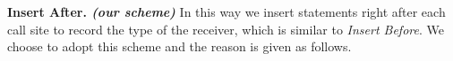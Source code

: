 \documentclass{fac}
\begin{document}
\textbf{Insert After. \emph{(our scheme)}}
In this way we insert statements right after each call site to record the type of the receiver, which is similar to \emph{Insert Before}. We choose to adopt this scheme and the reason is given as follows.
\end{document}
